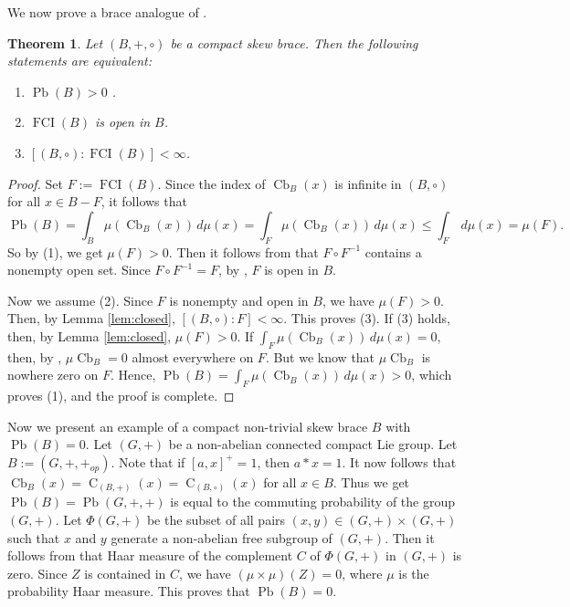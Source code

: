 \documentclass[oneside]{amsart}
\numberwithin{equation}{section}
\theoremstyle{plain}
\newtheorem{thm}[equation]{Theorem}
\theoremstyle{definition}
\newcommand{\C}{\operatorname{C} }
\newcommand{\Cb}{\operatorname{Cb} }
\newcommand{\Pb}{\operatorname{Pb} }
\newcommand{\FCI}{\operatorname{FCI}}
\begin{document}
We now prove a brace analogue of \cite[Theorem 1.2]{HR12}.
\begin{thm}
    Let $(B,+, \circ)$ be a compact  skew brace. Then the following statements are equivalent:
    \begin{enumerate}
        \item $\Pb(B)>0$ .
        \item $\FCI(B)$ is open in $B$.
        \item $[(B,\circ): \FCI(B)]<\infty$.
    \end{enumerate}
\end{thm}
\begin{proof}
 Set $F:= \FCI(B)$. Since the index of $\Cb_B(x)$ is infinite in $(B, \circ)$ for all $x \in B - F$, it follows that 
 $$\Pb(B)= \int_{B} \mu(\Cb_{B}(x)) \, d \mu(x)= \int_{F} \mu(\Cb_{B}(x)) \, d \mu(x) \leqslant  \int_{F}  \, d \mu(x)=\mu(F).$$ 
 So by  (1), we get  $\mu(F)>0$. Then it follows from  \cite[ Corollary 20.17]{ES63} that $F\circ F^{-1}$ contains a nonempty open set.  Since $F\circ F^{-1} = F$,  by \cite[Theorem 5.5]{ES63}, $F$ is open in $B$.
 
   Now we assume (2).  Since $F$ is  nonempty and open in $B$, we have $\mu(F) > 0$. Then, by Lemma \ref{lem:closed},  $[(B,\circ) : F] < \infty$.
 This proves (3).  If (3) holds, then, by Lemma \ref{lem:closed},  $\mu(F) > 0$. If $\int_{F} \mu(\Cb_{B}(x)) \, d \mu(x) = 0$, then,  by \cite[Theorem 1.39]{WR87}, $\mu \Cb_B = 0$ almost everywhere on $F$. But we know that  $\mu \Cb_B$ is nowhere zero on $F$. Hence,  $\Pb(B)= \int_{F} \mu(\Cb_{B}(x)) \, d \mu(x)>0$, which proves (1), and the proof is complete.
\end{proof}
 
Now we present an example of a compact  non-trivial skew brace $B$ with $\Pb(B)=0$.  Let $(G,+)$ be a non-abelian connected compact Lie group. Let $B := (G, +, +_{op})$. Note that if $[a, x]^+ = 1$, then $a*x=1$. It now follows that  $\Cb_B(x) = \C_{(B, +)}(x) =  \C_{(B, \circ)}(x)$ for all $x \in B$. Thus we get $\Pb(B) = \Pb(G, +, +)$ is equal to the commuting probability of the group $(G, +)$.  Let $\Phi(G, +)$ be the subset of all pairs $(x, y) \in (G, +) \times (G, +)$ such that $x$ and $y$ generate a non-abelian free subgroup of $(G, +)$. Then it follows from  \cite[Proposition 6.86. and Exercise E 6.18.]{HM23} that   Haar measure of the complement  $C$ of $\Phi(G, +)$ in $(G, +)$ is zero. Since $Z$ is contained in $C$, we have $(\mu \times \mu)(Z) = 0$, where $\mu$ is the probability Haar measure. This proves that $\Pb(B) = 0$.
\end{document}

